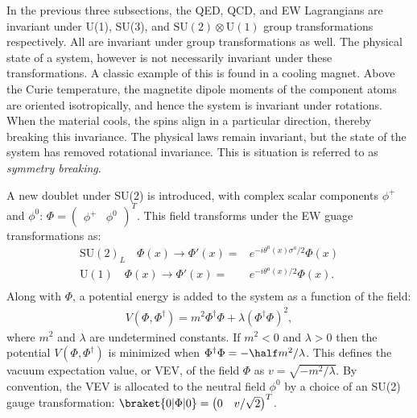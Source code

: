 In the previous three subsections, the QED, QCD, and EW Lagrangians are invariant under U(1), SU(3), and $\text{SU}(2)\otimes\text{U}(1)$ group transformations respectively.
All are invariant under \poincare group transformations as well.
The physical state of a system, however is not necessarily invariant under these transformations.
A classic example of this is found in a cooling magnet.
Above the Curie temperature, the magnetite dipole moments of the component atoms are oriented isotropically, and hence the system is invariant under rotations.
When the material cools, the spins align in a particular direction, thereby breaking this invariance.
The physical laws remain invariant, but the state of the system has removed rotational invariance.
This is situation is referred to as \emph{symmetry breaking}.

A new doublet under SU(2) is introduced, with complex scalar components $\phi^+$ and $\phi^0$: $\Phi=\begin{pmatrix}\phi^+&\phi^0\end{pmatrix}^T$.
This field transforms under the EW guage transformations as:
\begin{equation}\begin{split}\label{eqn:scalarTransform}
    \text{SU}(2)_L\quad\Phi(x)\to\Phi'(x)=&e^{-i\theta^a(x)\sigma^a/2}\Phi(x) \\
    \text{U}(1)\quad\Phi(x)\to\Phi'(x)=&e^{-i\theta^a(x)/2}\Phi(x). \\
\end{split}\end{equation} 
Along with $\Phi$, a potential energy is added to the system as a function of the field:
\begin{equation}\begin{split}
V(\Phi,\Phi^\dagger)=m^2\Phi^\dagger\Phi+\lambda(\Phi^\dagger\Phi)^2,
\end{split}\end{equation} 
where $m^2$ and $\lambda$ are undetermined constants.
If $m^2<0$ and $\lambda>0$ then the potential $V(\Phi,\Phi^\dagger)$ is minimized when $\Phi^\dagger\Phi=-\half m^2/\lambda$.
This defines the vacuum expectation value, or VEV, of the field $\Phi$ as $v=\sqrt{-m^2/\lambda}$. 
By convention, the VEV is allocated to the neutral field $\phi^0$ by a choice of an SU(2) gauge transformation: $\braket{0|\Phi|0}=\begin{pmatrix}0&v/\sqrt{2}\end{pmatrix}^T$.


